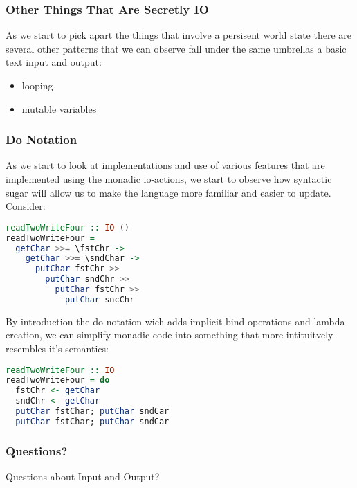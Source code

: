 \documentclass{beamer}
\begin{document}
\begin{frame}
  \frametitle{Other Things That Are Secretly IO}
  As we start to pick apart the things that involve a persisent world
  state there are several other patterns that we can observe fall
  under the same umbrellas a basic text input and output:
  \begin{itemize}
  \item looping
  \item mutable variables
  \end{itemize}
\end{frame}

\begin{frame}[fragile]
  \frametitle{Do Notation}
  As we start to look at implementations and use of various features
  that are implemented using the monadic io-actions, we start to
  observe how syntactic sugar will allow us to make the language more
  familiar and easier to update.  Consider:
\begin{lstlisting}[language=haskell]
readTwoWriteFour :: IO ()
readTwoWriteFour =
  getChar >>= \fstChr ->
    getChar >>= \sndChar ->
      putChar fstChr >>
        putChar sndChr >>
          putChar fstChr >>
            putChar sncChr
\end{lstlisting}
\end{frame}

\begin{frame}[fragile]
  By introduction the do notation wich adds implicit bind operations
  and lambda creation, we can simplify monadic code into something
  that more intituitvely resembles it's semantics:
\begin{lstlisting}[language=haskell]
readTwoWriteFour :: IO
readTwoWriteFour = do
  fstChr <- getChar
  sndChr <- getChar
  putChar fstChar; putChar sndCar
  putChar fstChar; putChar sndCar
\end{lstlisting}
\end{frame}
\begin{frame}
  \frametitle{Questions?}
  Questions about Input and Output?
\end{frame}
\end{document}
